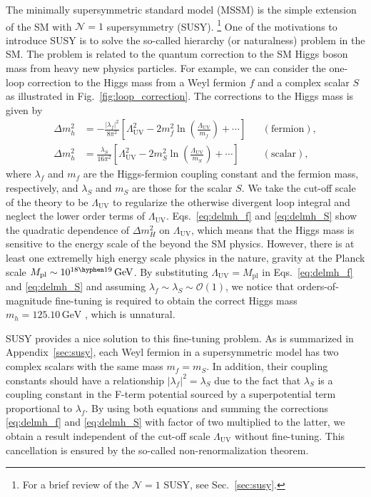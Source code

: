 \documentclass[12pt,twoside,book]{article}
\begin{document}
The minimally supersymmetric standard model (MSSM) is the simple extension of the SM with $\mathcal{N} = 1$ supersymmetry (SUSY).
\footnote{
  For a brief review of the $\mathcal{N} = 1$ SUSY, see Sec.~\ref{sec:susy}.
}
One of the motivations to introduce SUSY is to solve the so-called hierarchy (or naturalness) problem \cite{Weinberg:1975gm,Gildener:1976ai,Susskind:1978ms} in the SM.
The problem is related to the quantum correction to the SM Higgs boson mass from heavy new physics particles.
For example, we can consider the one-loop correction to the Higgs mass from a Weyl fermion $f$ and a complex scalar $S$ as illustrated in Fig.~\ref{fig:loop_correction}.
The corrections to the Higgs mass is given by
\begin{align}
  \Delta m_h^2 &= -\frac{|\lambda_f|^2}{8 \pi^2} \left[
  \Lambda_{\mathrm{UV}}^2 - 2 m_f^2 \ln \left( \frac{\Lambda_{\mathrm{UV}}}{m_f} \right)
  + \cdots \right] & &\mathrm{(fermion)}, \label{eq:delmh_f}\\
  \Delta m_h^2 &= \frac{\lambda_S}{16 \pi^2} \left[
  \Lambda_{\mathrm{UV}}^2 - 2 m_S^2 \ln \left( \frac{\Lambda_{\mathrm{UV}}}{m_S} \right)
  + \cdots \right] & &\mathrm{(scalar)}, \label{eq:delmh_S}
\end{align}
where $\lambda_f$ and $m_f$ are the Higgs-fermion coupling constant and the fermion mass, respectively, and $\lambda_S$ and $m_S$ are those for the scalar $S$.
We take the cut-off scale of the theory to be $\Lambda_{\mathrm{UV}}$ to regularize the otherwise divergent loop integral and neglect the lower order terms of $\Lambda_{\mathrm{UV}}$.
Eqs.~\eqref{eq:delmh_f} and \eqref{eq:delmh_S} show the quadratic dependence of $\Delta m_H^2$ on $\Lambda_{\mathrm{UV}}$, which means that the Higgs mass is sensitive to the energy scale of the beyond the SM physics.
However, there is at least one extremelly high energy scale physics in the nature, gravity at the Planck scale $M_{\mathrm{pl}} \sim 10^{18 \hyphen 19}\,\mathrm{GeV}$.
By substituting $\Lambda_{\mathrm{UV}} = M_{\mathrm{pl}}$ in Eqs.~\eqref{eq:delmh_f} and \eqref{eq:delmh_S} and assuming $\lambda_f \sim \lambda_S \sim \mathcal{O} (1)$, we notice that orders-of-magnitude fine-tuning is required to obtain the correct Higgs mass $m_h = 125.10\,\mathrm{GeV}$ \cite{Tanabashi:2018oca}, which is unnatural.

SUSY provides a nice solution to this fine-tuning problem.
As is summarized in Appendix~\ref{sec:susy},  each Weyl fermion in a supersymmetric model has two complex scalars with the same mass $m_f = m_S$.
In addition, their coupling constants should have a relationship $|\lambda_f|^2 = \lambda_S$ due to the fact that $\lambda_S$ is a coupling constant in the F-term potential sourced by a superpotential term proportional to $\lambda_f$. 
By using both equations and summing the corrections \eqref{eq:delmh_f} and \eqref{eq:delmh_S} with factor of two multiplied to the latter, we obtain a result independent of the cut-off scale $\Lambda_{\mathrm{UV}}$ without fine-tuning.
This cancellation is ensured by the so-called non-renormalization theorem. \cite{Salam:1974jj, Grisaru:1979wc}
\end{document}
